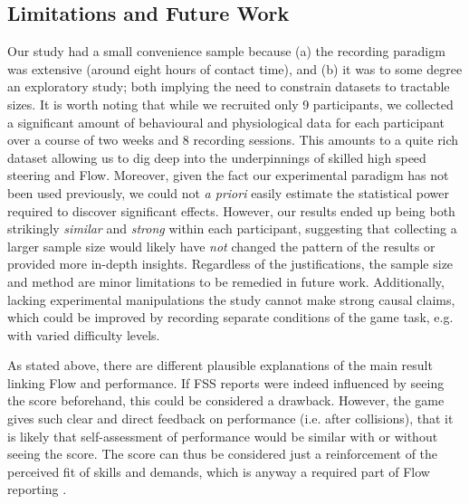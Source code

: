 \documentclass{frontierstyle/frontiersSCNS}
\begin{document}
\subsection{Limitations and Future Work}
Our study had a small convenience sample because (a) the recording paradigm was extensive (around eight hours of contact time), and (b) it was to some degree an exploratory study; both implying the need to constrain datasets to tractable sizes. It is worth noting that while we recruited only 9 participants, we collected a significant amount of behavioural and physiological data for each participant over a course of two weeks and 8 recording sessions. This amounts to a quite rich dataset allowing us to dig deep into the underpinnings of skilled high speed steering and Flow. Moreover, given the fact our experimental paradigm has not been used previously, we could not {\it a priori} easily estimate the statistical power required to discover significant effects. However, our results ended up being both strikingly {\it similar} and {\it strong} within each participant, suggesting that collecting a larger sample size would likely have {\it not} changed the pattern of the results or provided more in-depth insights. Regardless of the justifications, the sample size and method are minor limitations to be remedied in future work. Additionally, lacking experimental manipulations the study cannot make strong causal claims, which could be improved by recording separate conditions of the game task, e.g. with varied difficulty levels.

As stated above, there are different plausible explanations of the main result linking Flow and performance. If FSS reports were indeed influenced by seeing the score beforehand, this could be considered a drawback. However, the game gives such clear and direct feedback on performance (i.e. after collisions), that it is likely that self-assessment of performance would be similar with or without seeing the score. The score can thus be considered just a reinforcement of the perceived fit of skills and demands, which is anyway a required part of Flow reporting \citep{Keller2012}.
\end{document}
